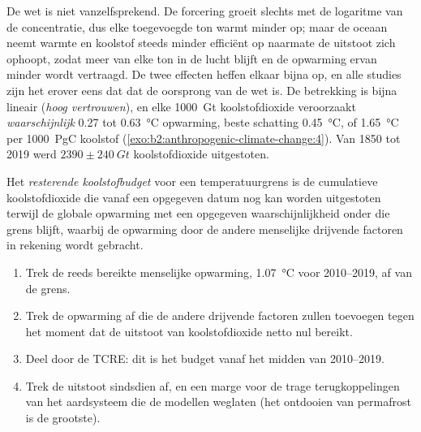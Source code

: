 De wet is niet vanzelfsprekend. De forcering groeit slechts met de logaritme van de concentratie, dus elke
toegevoegde ton warmt minder op; maar de oceaan neemt warmte en koolstof steeds minder efficiënt op naarmate de
uitstoot zich ophoopt, zodat meer van elke ton in de lucht blijft en de opwarming ervan minder wordt vertraagd. De
twee effecten heffen elkaar bijna op, en alle studies zijn het erover eens dat dat de oorsprong van de wet is. De betrekking is
bijna lineair (\emph{hoog vertrouwen}), en elke \qty{1000}{Gt} koolstofdioxide veroorzaakt \emph{waarschijnlijk}
0.27 tot \qty{0.63}{\celsius} opwarming, beste schatting \qty{0.45}{\celsius}, of \qty{1.65}{\celsius}
per \qty{1000}{PgC} koolstof (\cref{exo:b2:anthropogenic-climate-change:4}). Van 1850 tot 2019
werd $\num{2390} \pm \qty{240}{Gt}$ koolstofdioxide uitgestoten.

\begin{definition}\label{def:b2:anthropogenic-climate-change:budget}
Het \emph{resterende koolstofbudget} voor een temperatuurgrens is de
cumulatieve koolstofdioxide die vanaf een opgegeven datum nog kan worden uitgestoten terwijl de globale opwarming
met een opgegeven waarschijnlijkheid onder die grens blijft, waarbij de opwarming door de andere menselijke drijvende factoren
in rekening wordt gebracht.
\end{definition}

\begin{method}\label{met:b2:anthropogenic-climate-change:budget}
\begin{enumerate}
  \item Trek de reeds bereikte menselijke opwarming, \qty{1.07}{\celsius} voor 2010--2019, af van de
        grens.
  \item Trek de opwarming af die de andere drijvende factoren zullen toevoegen tegen het moment dat de uitstoot van koolstofdioxide
        netto nul bereikt.
  \item Deel door de TCRE: dit is het budget vanaf het midden van 2010--2019.
  \item Trek de uitstoot sindsdien af, en een marge voor de trage terugkoppelingen van het aardsysteem die de
        modellen weglaten (het ontdooien van permafrost is de grootste).
\end{enumerate}
\end{method}

